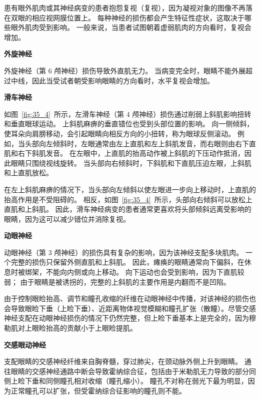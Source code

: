 \begin{proposition}[眼外肌肉或神经损伤] \label{box:35_1}

\quad \quad 患有眼外肌肉或其神经病变的患者抱怨复视（复视），因为凝视对象的图像不再落在双眼的相应视网膜位置上。
每种神经的损伤都会产生特征性症状，这取决于哪些眼外肌肉受到影响。
一般来说，当患者试图朝着虚弱肌肉的方向看时，复视会增加。


\textbf{外旋神经}

\quad \quad 外旋神经（第 6 颅神经）损伤导致外直肌无力。
当病变完全时，眼睛不能外展超过中线，因此当受试者朝受影响眼睛的方向看时，水平复视会增加。


\textbf{滑车神经}

\quad \quad 如图~\ref{fig:35_4}~所示，左滑车神经（第 4 颅神经）损伤通过削弱上斜肌影响扭转和垂直眼球运动。
上斜肌麻痹的垂直错位也受到头部位置的影响。
向一侧倾斜，使耳朵向肩膀移动，会引起眼睛向相反方向的小扭转，称为眼球反侧滚动。
例如，当头部向左倾斜时，左眼通常由左上直肌和左上斜肌发音，而右眼则由右下直肌和右下斜肌发音。
在左眼中，上直肌的抬高动作被上斜肌的下压动作抵消，因此眼睛只围绕视线旋转。
当头部向右倾斜时，下斜肌和下直肌压迫左眼，上斜肌和上直肌放松。


\quad \quad 在左上斜肌麻痹的情况下，当头部向左倾斜以使左眼进一步向上移动时，上直肌的抬高作用是不受阻碍的。
相反，如图~\ref{fig:35_4}~所示，头部向右倾斜可以放松上直肌和上斜肌。
因此，滑车神经病变的患者通常更喜欢将头部倾斜远离受影响的眼睛，因为这可以减少错位并消除复视。


\textbf{动眼神经}

\quad \quad 动眼神经（第 3 颅神经）的损伤具有复杂的影响，因为该神经支配多块肌肉。
一个完整的损伤只保留外侧直肌和上斜肌。
因此，瘫痪的眼睛通常向下偏斜，在休息时被绑架，不能向内侧或向上移动。
向下运动也会受到影响，因为下直肌较弱；
由于眼睛是被诱拐的，完整的上斜肌的主要作用是内翻而不是凹陷。


\quad \quad 由于控制眼睑抬高、调节和瞳孔收缩的纤维在动眼神经中传播，对该神经的损伤也会导致眼睑下垂（上睑下垂）、近距离物体视觉模糊和瞳孔扩张（散瞳）。尽管交感神经支配在动眼神经损伤的情况下仍然完整，但上睑下垂基本上是完全的，因为穆勒肌对上眼睑抬高的贡献小于上眼睑提肌。


\textbf{交感眼动神经}

\quad \quad 支配眼睛的交感神经纤维来自胸脊髓，穿过肺尖，在颈动脉外侧上升到眼睛。
通往眼睛的交感神经通路中断会导致霍纳综合征，包括由于米勒肌无力导致的部分同侧上睑下垂和同侧瞳孔相对收缩（瞳孔缩小）。
瞳孔不对称在弱光下最为明显，因为正常瞳孔可以扩张，但受霍纳综合征影响的瞳孔则不能。
	
\end{proposition}


